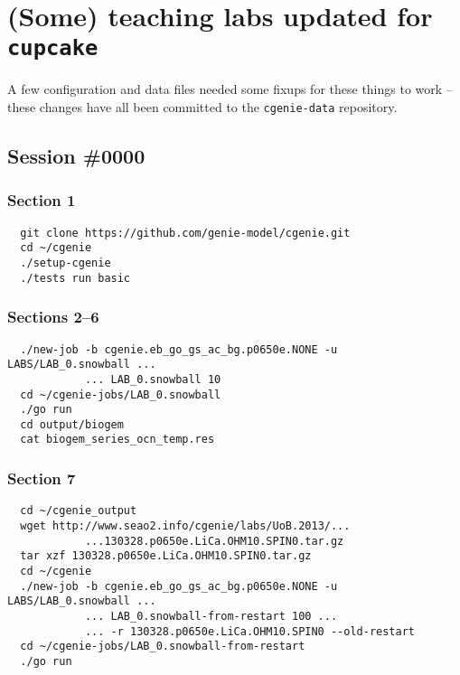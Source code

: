 \documentclass[a4paper,10pt,article]{memoir}
\begin{document}
\appendix
\chapter{(Some) teaching labs updated for \texttt{cupcake}}

A few configuration and data files needed some fixups for these things
to work -- these changes have all been committed to the
\texttt{cgenie-data} repository.

\section{Session \#0000}

\subsection*{Section 1}

\begin{verbatim}
  git clone https://github.com/genie-model/cgenie.git
  cd ~/cgenie
  ./setup-cgenie
  ./tests run basic
\end{verbatim}

\subsection*{Sections 2--6}

\begin{verbatim}
  ./new-job -b cgenie.eb_go_gs_ac_bg.p0650e.NONE -u LABS/LAB_0.snowball ...
            ... LAB_0.snowball 10
  cd ~/cgenie-jobs/LAB_0.snowball
  ./go run
  cd output/biogem
  cat biogem_series_ocn_temp.res
\end{verbatim}

\subsection*{Section 7}

\begin{verbatim}
  cd ~/cgenie_output
  wget http://www.seao2.info/cgenie/labs/UoB.2013/...
            ...130328.p0650e.LiCa.OHM10.SPIN0.tar.gz
  tar xzf 130328.p0650e.LiCa.OHM10.SPIN0.tar.gz
  cd ~/cgenie
  ./new-job -b cgenie.eb_go_gs_ac_bg.p0650e.NONE -u LABS/LAB_0.snowball ...
            ... LAB_0.snowball-from-restart 100 ...
            ... -r 130328.p0650e.LiCa.OHM10.SPIN0 --old-restart
  cd ~/cgenie-jobs/LAB_0.snowball-from-restart
  ./go run
\end{verbatim}
\end{document}
